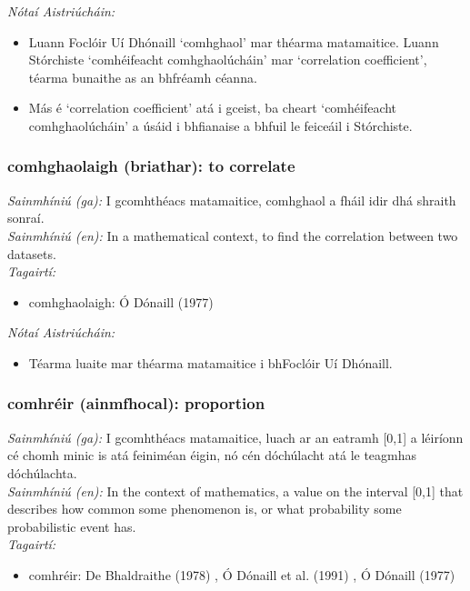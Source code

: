 \documentclass{article}
\begin{document}
 \noindent \textit{Nótaí Aistriúcháin:}
\begin{itemize}
	\item Luann Foclóir Uí Dhónaill `comhghaol' mar théarma matamaitice. Luann Stórchiste `comhéifeacht comhghaolúcháin' mar `correlation coefficient', téarma bunaithe as an bhfréamh céanna.
	\item Más é `correlation coefficient' atá i gceist, ba cheart `comhéifeacht comhghaolúcháin' a úsáid i bhfianaise a bhfuil le feiceáil i Stórchiste.
\end{itemize}


\subsubsection*{comhghaolaigh (briathar): to correlate}
 \noindent \textit{Sainmhíniú (ga):} I gcomhthéacs matamaitice, comhghaol a fháil idir dhá shraith sonraí.
\\
 \noindent \textit{Sainmhíniú (en):} In a mathematical context, to find the correlation between two datasets.
\\
 \noindent \textit{Tagairtí:}
\begin{itemize}
	\item comhghaolaigh: Ó Dónaill (1977) \cite{odonaill}
\end{itemize}

 \noindent \textit{Nótaí Aistriúcháin:}
\begin{itemize}
	\item Téarma luaite mar théarma matamaitice i bhFoclóir Uí Dhónaill.
\end{itemize}


\subsubsection*{comhréir (ainmfhocal): proportion}
 \noindent \textit{Sainmhíniú (ga):} I gcomhthéacs matamaitice, luach ar an eatramh [0,1] a léiríonn cé chomh minic is atá feiniméan éigin, nó cén dóchúlacht atá le teagmhas dóchúlachta.
\\
 \noindent \textit{Sainmhíniú (en):} In the context of mathematics, a value on the interval [0,1] that describes how common some phenomenon is, or what probability some probabilistic event has.
\\
 \noindent \textit{Tagairtí:}
\begin{itemize}
	\item comhréir: De Bhaldraithe (1978) \cite{de-bhaldraithe}, Ó Dónaill et al. (1991) \cite{focloir-beag}, Ó Dónaill (1977) \cite{odonaill}
\end{itemize}
\end{document}
